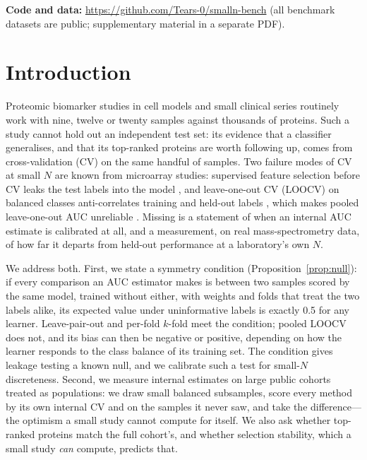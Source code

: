 \documentclass[10pt,letterpaper]{article}
\newcommand{\coderepo}{\url{https://github.com/Tears-0/smalln-bench}}
\begin{document}
\noindent\textbf{Code and data:} \coderepo{} (all benchmark datasets are public; supplementary material in a
separate PDF).
\newpage
\setcounter{page}{1}

\section{Introduction}

Proteomic biomarker studies in cell models and small clinical series routinely work with nine, twelve or
twenty samples against thousands of proteins. Such a study cannot hold out an independent test set: its
evidence that a classifier generalises, and that its top-ranked proteins are worth following up, comes from
cross-validation (CV) on the same handful of samples. Two failure modes of CV at small $N$ are known from
microarray studies: supervised feature selection before CV leaks the test labels into the model
\citep{ambroise2002selection,varma2006bias}, and leave-one-out CV (LOOCV) on balanced classes
anti-correlates training and held-out labels \citep{parker2007stratification}, which makes pooled
leave-one-out AUC unreliable \citep{airola2011auc}. Missing is a statement of when an internal AUC estimate
is calibrated at all, and a measurement, on real mass-spectrometry data, of how far it departs from
held-out performance at a laboratory's own $N$.

We address both. First, we state a symmetry condition (Proposition~\ref{prop:null}): if every comparison an
AUC estimator makes is between two samples scored by the same model, trained without either, with weights and
folds that treat the two labels alike, its expected value under uninformative labels is exactly 0.5 for any
learner. Leave-pair-out and per-fold $k$-fold meet
the condition; pooled LOOCV does not, and its bias can then be negative or positive, depending on how the
learner responds to the class balance of its training set. The condition gives leakage testing a known
null, and we calibrate such a test for small-$N$ discreteness. Second, we measure internal estimates on
large public cohorts treated as populations: we draw small balanced subsamples, score every method by its
own internal CV and on the samples it never saw, and take the difference---the optimism a small study
cannot compute for itself. We also ask whether top-ranked proteins match the full cohort's, and whether
selection stability, which a small study \emph{can} compute, predicts that.
\end{document}
